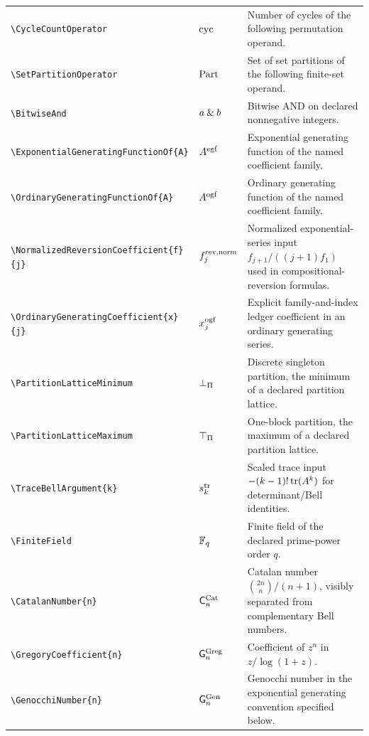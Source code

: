 \documentclass[11pt,oneside]{article}
\theoremstyle{definition}
\theoremstyle{remark}
\DeclareRobustCommand{\commandname}[1]{\texttt{\textbackslash#1}}
\begin{document}
\begin{longtable}{@{}S{0.35\textwidth}L{0.14\textwidth}L{0.45\textwidth}@{}}
\commandname{CycleCountOperator} & \(\operatorname{cyc}\) & Number of cycles
of the following permutation operand.\\
\commandname{SetPartitionOperator} & \(\operatorname{Part}\) & Set of set
partitions of the following finite-set operand.\\
\commandname{BitwiseAnd} & \(a\mathbin{\&} b\) & Bitwise AND on declared
nonnegative integers.\\
\commandname{ExponentialGeneratingFunctionOf}\texttt{\{A\}} &
\(A^{\mathrm{egf}}\) & Exponential generating function of
the named coefficient family.\\
\commandname{OrdinaryGeneratingFunctionOf}\texttt{\{A\}} &
\(A^{\mathrm{ogf}}\) & Ordinary generating function of the
named coefficient family.\\
\commandname{NormalizedReversionCoefficient}\texttt{\{f\}\{j\}} &
\(f^{\mathrm{rev,norm}}_{j}\) & Normalized exponential-series
input \(f_{j+1}/((j+1)f_1)\) used in compositional-reversion formulas.\\
\commandname{OrdinaryGeneratingCoefficient}\texttt{\{x\}\{j\}} &
\(x^{\mathrm{ogf}}_{j}\) & Explicit family-and-index ledger
coefficient in an ordinary generating series.\\
\commandname{PartitionLatticeMinimum} & \(\bot_{\Pi}\) &
Discrete singleton partition, the minimum of a declared partition lattice.\\
\commandname{PartitionLatticeMaximum} & \(\top_{\Pi}\) &
One-block partition, the maximum of a declared partition lattice.\\
\commandname{TraceBellArgument}\texttt{\{k\}} &
\(s^{\mathrm{tr}}_{k}\) & Scaled trace input
\(-(k-1)!\operatorname{tr}(A^k)\) for determinant/Bell identities.\\
\commandname{FiniteField} & \(\mathbb{F}_q\) & Finite field of the declared
prime-power order \(q\).\\
\commandname{CatalanNumber}\texttt{\{n\}} & \(\mathsf{C}^{\mathrm{Cat}}_{n}\) & Catalan
number \(\binom{2n}{n}/(n+1)\), visibly separated from complementary Bell
numbers.\\
\commandname{GregoryCoefficient}\texttt{\{n\}} &
\(\mathsf{G}^{\mathrm{Greg}}_{n}\) & Coefficient of \(z^n\) in
\(z/\log(1+z)\).\\
\commandname{GenocchiNumber}\texttt{\{n\}} & \(\mathsf{G}^{\mathrm{Gen}}_{n}\) &
Genocchi number in the exponential generating convention specified below.\\

\end{longtable}
\end{document}
